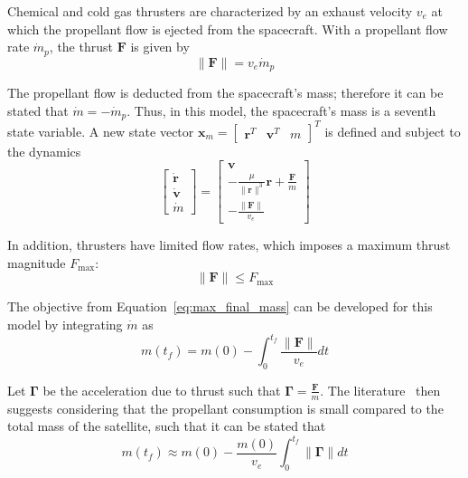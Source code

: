 Chemical and cold gas thrusters are characterized by an exhaust velocity \(v_e\) at which the propellant flow is ejected from the spacecraft. With a propellant flow rate \(\dot{m}_p\), the thrust \(\mathbf{F}\) is given by
\begin{equation}
   \lVert \mathbf{F} \rVert = v_e \dot{m}_p
\end{equation}

The propellant flow is deducted from the spacecraft's mass; therefore it can be stated that \(\dot{m} = - \dot{m}_p\). Thus, in this model, the spacecraft's mass is a seventh state variable. A new state vector \(\mathbf{x}_m = \begin{bmatrix}
    \mathbf{r}^T & \mathbf{v}^T & m 
\end{bmatrix}^T\) is defined and subject to the dynamics
\begin{equation}
    \begin{bmatrix}
        \dot{\mathbf{r}} \\ \dot{\mathbf{v}} \\ \dot{m}
    \end{bmatrix} = \begin{bmatrix}
        \mathbf{v} \\ -\frac{\mu}{\lVert \mathbf{r} \rVert^3}\mathbf{r} + \frac{\mathbf{F}}{m} \\ -\frac{\lVert \mathbf{F} \rVert}{v_e}
    \end{bmatrix}
\end{equation}

In addition, thrusters have limited flow rates, which imposes a maximum thrust magnitude \(F_{\max}\):
\begin{equation}
    \lVert \mathbf{F} \rVert \leq F_{\max}
\end{equation}

The objective from Equation~\eqref{eq:max_final_mass} can be developed for this model by integrating \(\dot{m}\) as
\begin{equation}
    m(t_f) = m(0) - \int_0^{t_f} \frac{\lVert \mathbf{F} \rVert}{v_e} dt
\end{equation}

Let \(\mathbf{\Gamma}\) be the acceleration due to thrust such that \(\mathbf{\Gamma} = \frac{\mathbf{F}}{m}\). The literature~\cite{Conway_2010} then suggests considering that the propellant consumption is small compared to the total mass of the satellite, such that it can be stated that
\begin{equation}
    m(t_f) \approx m(0) - \frac{m(0)}{v_e}\int_0^{t_f} \lVert \mathbf{\Gamma} \rVert dt
\end{equation}

